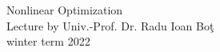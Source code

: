 \documentclass[11pt, a4paper]{article}
\numberwithin{equation}{section}
\theoremstyle{definition}
\begin{document}
\begin{center}
    \Huge{Nonlinear Optimization} \\
    \vspace{10pt}
    \Large{Lecture by Univ.-Prof. Dr. Radu Ioan Bo\c{t}} \\
    \large{winter term 2022}
\end{center}




\end{document}
